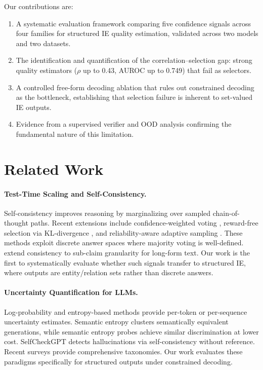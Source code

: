 \documentclass[11pt,a4paper]{article}
\begin{document}
Our contributions are:
\begin{enumerate}
\item A systematic evaluation framework comparing five confidence signals across four families for structured IE quality estimation, validated across two models and two datasets.
\item The identification and quantification of the correlation--selection gap: strong quality estimators ($\rho$ up to 0.43, AUROC up to 0.749) that fail as selectors.
\item A controlled free-form decoding ablation that rules out constrained decoding as the bottleneck, establishing that selection failure is inherent to set-valued IE outputs.
\item Evidence from a supervised verifier and OOD analysis confirming the fundamental nature of this limitation.
\end{enumerate}

\section{Related Work}

\paragraph{Test-Time Scaling and Self-Consistency.}
Self-consistency \cite{wang2023selfconsistency} improves reasoning by marginalizing over sampled chain-of-thought paths. Recent extensions include confidence-weighted voting \cite{cisc2025}, reward-free selection via KL-divergence \cite{selfcertainty2026}, and reliability-aware adaptive sampling \cite{reasc2026}. These methods exploit discrete answer spaces where majority voting is well-defined. \citet{atomicsc2024} extend consistency to sub-claim granularity for long-form text. Our work is the first to systematically evaluate whether such signals transfer to structured IE, where outputs are entity/relation sets rather than discrete answers.

\paragraph{Uncertainty Quantification for LLMs.}
Log-probability and entropy-based methods \cite{kadavath2022language,kuhn2023semantic} provide per-token or per-sequence uncertainty estimates. Semantic entropy \cite{kuhn2023semantic} clusters semantically equivalent generations, while semantic entropy probes \cite{semanticprobes2024} achieve similar discrimination at lower cost. SelfCheckGPT \cite{manakul2023selfcheckgpt} detects hallucinations via self-consistency without reference. Recent surveys \cite{uqsurvey2025acl,uqcalibsurvey2025} provide comprehensive taxonomies. Our work evaluates these paradigms specifically for structured outputs under constrained decoding.
\end{document}
